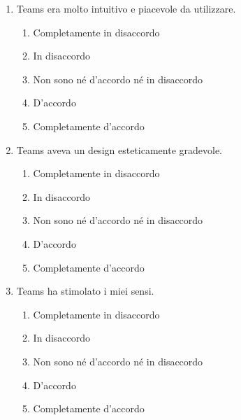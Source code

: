 \documentclass{article}
\newcommand{\app}{Teams \hspace{0.1em}}
\begin{document}
\begin{enumerate}[label=\textbf{Domanda \arabic*.}, resume]
    \item \app era molto intuitivo e piacevole da utilizzare.
    \begin{enumerate}
    \item Completamente in disaccordo
    \item In disaccordo
    \item Non sono né d’accordo né in disaccordo
    \item D’accordo
    \item Completamente d’accordo
\end{enumerate}
    \item \app aveva un design esteticamente gradevole.
    \begin{enumerate}
    \item Completamente in disaccordo
    \item In disaccordo
    \item Non sono né d’accordo né in disaccordo
    \item D’accordo
    \item Completamente d’accordo
\end{enumerate}
    \item \app ha stimolato i miei sensi.
    \begin{enumerate}
    \item Completamente in disaccordo
    \item In disaccordo
    \item Non sono né d’accordo né in disaccordo
    \item D’accordo
    \item Completamente d’accordo
\end{enumerate}
\end{enumerate}
\end{document}
